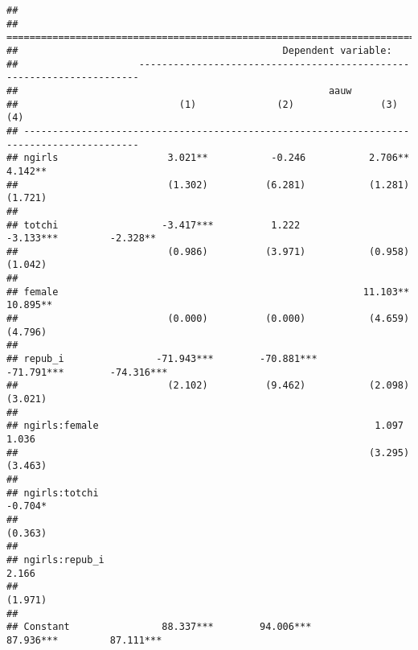 \documentclass[
]{article}
\begin{document}
\begin{verbatim}
## 
## ==========================================================================================
##                                              Dependent variable:                          
##                     ----------------------------------------------------------------------
##                                                      aauw                                 
##                            (1)              (2)               (3)               (4)       
## ------------------------------------------------------------------------------------------
## ngirls                   3.021**           -0.246           2.706**           4.142**     
##                          (1.302)          (6.281)           (1.281)           (1.721)     
##                                                                                           
## totchi                  -3.417***          1.222           -3.133***         -2.328**     
##                          (0.986)          (3.971)           (0.958)           (1.042)     
##                                                                                           
## female                                                     11.103**          10.895**     
##                          (0.000)          (0.000)           (4.659)           (4.796)     
##                                                                                           
## repub_i                -71.943***        -70.881***       -71.791***        -74.316***    
##                          (2.102)          (9.462)           (2.098)           (3.021)     
##                                                                                           
## ngirls:female                                                1.097             1.036      
##                                                             (3.295)           (3.463)     
##                                                                                           
## ngirls:totchi                                                                 -0.704*     
##                                                                               (0.363)     
##                                                                                           
## ngirls:repub_i                                                                 2.166      
##                                                                               (1.971)     
##                                                                                           
## Constant                88.337***        94.006***         87.936***         87.111***    

\end{verbatim}
\end{document}
